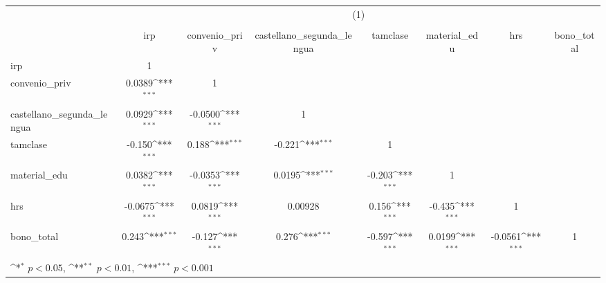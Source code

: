 {
\def\sym#1{\ifmmode^{#1}\else\(^{#1}\)\fi}
\begin{tabular}{l*{7}{c}}
\hline\hline
          &\multicolumn{7}{c}{(1)}                                                                                                             \\
          &\multicolumn{7}{c}{}                                                                                                                \\
          &      irp         &convenio\_priv         &castellano\_segunda\_lengua         & tamclase         &material\_edu         &      hrs         &bono\_total         \\
\hline
irp       &        1         &                  &                  &                  &                  &                  &                  \\
convenio\_priv&   0.0389\sym{***}&        1         &                  &                  &                  &                  &                  \\
castellano\_segunda\_lengua&   0.0929\sym{***}&  -0.0500\sym{***}&        1         &                  &                  &                  &                  \\
tamclase  &   -0.150\sym{***}&    0.188\sym{***}&   -0.221\sym{***}&        1         &                  &                  &                  \\
material\_edu&   0.0382\sym{***}&  -0.0353\sym{***}&   0.0195\sym{***}&   -0.203\sym{***}&        1         &                  &                  \\
hrs       &  -0.0675\sym{***}&   0.0819\sym{***}&  0.00928         &    0.156\sym{***}&   -0.435\sym{***}&        1         &                  \\
bono\_total&    0.243\sym{***}&   -0.127\sym{***}&    0.276\sym{***}&   -0.597\sym{***}&   0.0199\sym{***}&  -0.0561\sym{***}&        1         \\
\hline\hline
\multicolumn{8}{l}{\footnotesize \sym{*} \(p<0.05\), \sym{**} \(p<0.01\), \sym{***} \(p<0.001\)}\\
\end{tabular}
}
